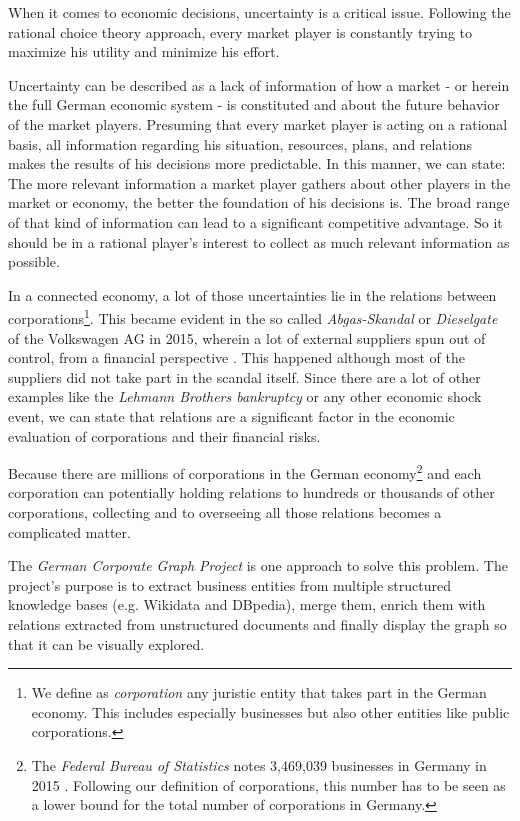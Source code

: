 \documentclass[
  a4paper,     %
  titlepage,   %
  oneside,     %
  parskip      %
]{scrartcl}          %
\begin{document}
    When it comes to economic decisions, uncertainty is a critical issue. Following the rational choice theory approach, every market player is constantly trying to maximize his utility and minimize his effort.

    Uncertainty can be described as a lack of information of how a market - or herein the full German economic system - is constituted and about the future behavior of the market players. Presuming that every market player is acting on a rational basis, all information regarding his situation, resources, plans, and relations makes the results of his decisions more predictable. In this manner, we can state: The more relevant information a market player gathers about other players in the market or economy, the better the foundation of his decisions is. The broad range of that kind of information can lead to a significant competitive advantage. So it should be in a rational player's interest to collect as much relevant information as possible.

    In a connected economy, a lot of those uncertainties lie in the relations between corporations\footnote{We define as \emph{corporation} any juristic entity that takes part in the German economy. This includes especially businesses but also other entities like public corporations.}. This became evident in the so called \emph{Abgas-Skandal} or \emph{Dieselgate} of the Volkswagen AG in 2015, wherein a lot of external suppliers spun out of control, from a financial perspective \cite{automobilwoche,stuttzeit}. This happened although most of the suppliers did not take part in the scandal itself. Since there are a lot of other examples like the \emph{Lehmann Brothers bankruptcy} or any other economic shock event, we can state that relations are a significant factor in the economic evaluation of corporations and their financial risks.

    Because there are millions of corporations in the German economy\footnote{ The \emph{Federal Bureau of Statistics} notes 3,469,039 businesses in Germany in 2015 \cite{destatis1}. Following our definition of corporations, this number has to be seen as a lower bound for the total number of corporations in Germany.} and each corporation can potentially holding relations to hundreds or thousands of other corporations, collecting and to overseeing all those relations becomes a complicated matter.

    The \emph{German Corporate Graph Project} is one approach to solve this problem. The project's purpose is to extract business entities from multiple structured knowledge bases (e.g. Wikidata and DBpedia), merge them, enrich them with relations extracted from unstructured documents and finally display the graph so that it can be visually explored.
\end{document}
